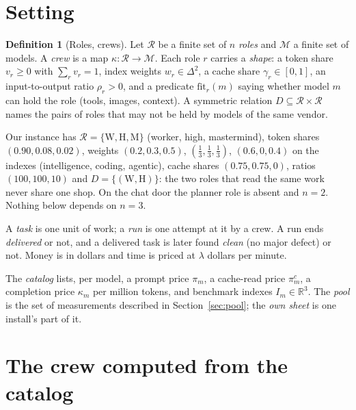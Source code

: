 \documentclass[10pt,a4paper]{article}
\newcommand{\R}{\mathbb{R}}
\newcommand{\roles}{\mathcal{R}}
\newcommand{\mods}{\mathcal{M}}
\newcommand{\seat}[1]{\mathrm{#1}}
\theoremstyle{definition}
\newtheorem{definition}{Definition}
\theoremstyle{remark}
\begin{document}
\section{Setting}
\label{sec:setting}

\begin{definition}[Roles, crews]
Let $\roles$ be a finite set of $n$ \emph{roles} and $\mods$ a finite set of models. A \emph{crew} is a map $\kappa:\roles\to\mods$. Each role $r$ carries a \emph{shape}: a token share $v_r\ge 0$ with $\sum_r v_r=1$, index weights $w_r\in\Delta^{2}$, a cache share $\gamma_r\in[0,1]$, an input-to-output ratio $\rho_r>0$, and a predicate $\mathrm{fit}_r(m)$ saying whether model $m$ can hold the role (tools, images, context). A symmetric relation $D\subseteq\roles\times\roles$ names the pairs of roles that may not be held by models of the same vendor.
\end{definition}

Our instance has $\roles=\{\seat{W},\seat{H},\seat{M}\}$ (worker, high, mastermind), token shares $(0.90,0.08,0.02)$, weights $(0.2,0.3,0.5)$, $(\tfrac13,\tfrac13,\tfrac13)$, $(0.6,0,0.4)$ on the indexes (intelligence, coding, agentic), cache shares $(0.75,0.75,0)$, ratios $(100,100,10)$ and $D=\{(\seat W,\seat H)\}$: the two roles that read the same work never share one shop. On the chat door the planner role is absent and $n=2$. Nothing below depends on $n=3$.

A \emph{task} is one unit of work; a \emph{run} is one attempt at it by a crew. A run ends \emph{delivered} or not, and a delivered task is later found \emph{clean} (no major defect) or not. Money is in dollars and time is priced at $\lambda$ dollars per minute.

The \emph{catalog} lists, per model, a prompt price $\pi_m$, a cache-read price $\pi^c_m$, a completion price $\kappa_m$ per million tokens, and benchmark indexes $I_m\in\R^3$. The \emph{pool} is the set of measurements described in Section~\ref{sec:pool}; the \emph{own sheet} is one install's part of it.

\section{The crew computed from the catalog}
\label{sec:catalog}
\end{document}
